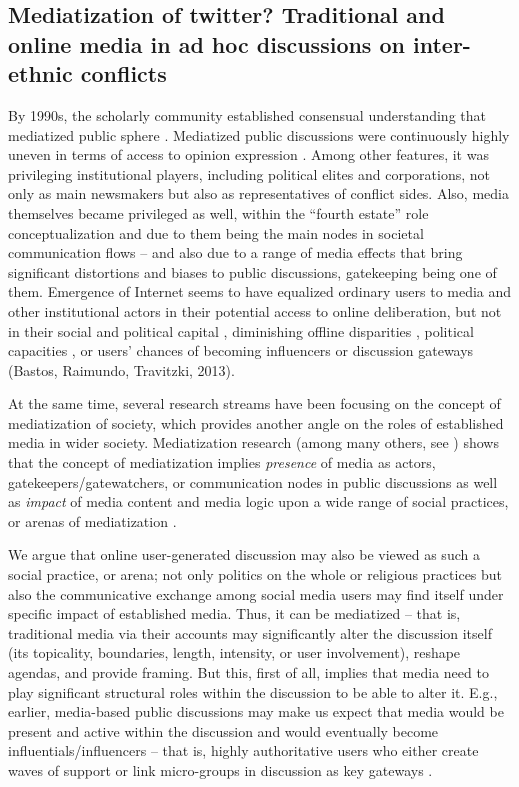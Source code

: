 \subsection{Mediatization of twitter? Traditional and online media in ad hoc discussions on inter-ethnic conflicts}\label{subsec:ch2/sec5/sub3}

By 1990s, the scholarly community established consensual understanding that mediatized public sphere \cite{Schulz}. Mediatized public discussions were continuously highly uneven in terms of access to opinion expression \cite{Calhoun}. Among other features, it was privileging institutional players, including political elites and corporations, not only as main newsmakers but also as representatives of conflict sides. Also, media themselves became privileged as well, within the “fourth estate” role conceptualization and due to them being the main nodes in societal communication flows -- and also due to a range of media effects that bring significant distortions and biases to public discussions, gatekeeping \cite{White1950,ShoemakerVos} being one of them. Emergence of Internet seems to have equalized ordinary users to media and other institutional actors in their potential access to online deliberation, but not in their social and political capital \cite{Fuchs}, diminishing offline disparities \cite{Daniels}, political capacities \cite{Chadwick}, or users’ chances of becoming influencers \cite{BodrunovaBlekanovMaksimov,BodrunovaLitvinenkoBlekanov2016} or discussion gateways (Bastos, Raimundo, Travitzki, 2013)\cite{BastosRaimundoTravitzki}.

At the same time, several research streams have been focusing on the concept of mediatization of society, which provides another angle on the roles of established media in wider society. Mediatization research (among many others, see \cite{Hjarvard,EsserStromback2014,HeppKrotz}) shows that the concept of mediatization implies \textit{presence} of media as actors, gatekeepers/gatewatchers, or communication nodes in public discussions as well as \textit{impact} of media content and media logic upon a wide range of social practices, or arenas of mediatization \cite[p.~253]{ThimmDangAnhEinspanner}.

We argue that online user-generated discussion may also be viewed as such a social practice, or arena; not only politics on the whole or religious practices but also the communicative exchange among social media users may find itself under specific impact of established media. Thus, it can be mediatized -- that is, traditional media via their accounts may significantly alter the discussion itself (its topicality, boundaries, length, intensity, or user involvement), reshape agendas, and provide framing. But this, first of all, implies that media need to play significant structural roles within the discussion to be able to alter it. E.g., earlier, media-based public discussions may make us expect that media would be present and active within the discussion and would eventually become influentials/influencers \cite{PattersonGrennyMaxfield,ChaHaddadiBenevenuto} -- that is, highly authoritative users who either create waves of support or link micro-groups in discussion as key gateways \cite{BodrunovaBlekanovMaksimov}.


